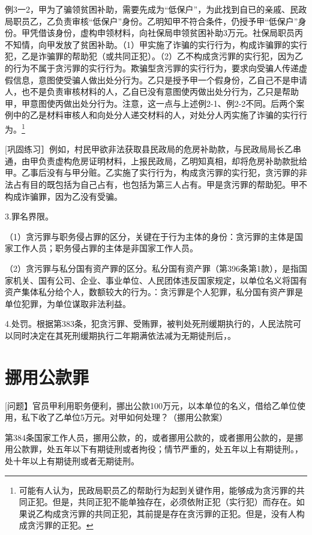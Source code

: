 例3一2，甲为了骗领贫困补助，需要先成为“低保户”，为此找到自已的亲戚、民政局职员乙，乙负责审核“低保户”身份。乙明知甲不符合条件，仍授予甲“低保户”身份。甲凭借该身份，虚构申领材料，向社保局申领贫困补助3万元。社保局职员丙不知情，向甲发放了贫困补助。（1）甲实施了诈骗的实行行为，构成诈骗罪的实行犯，乙是诈骗罪的帮助犯（或共同正犯）。（2）乙不构成贪污罪的实行犯，因为乙的行为不属于贪污罪的实行行为。欺骗型贪污罪的实行行为，要求向受骗人传递虚假信息，意图使受骗人做出处分行为。乙只是授予甲一个假身份，乙自己不是申请人，也不是负责审核材料的人，乙自已没有意图使丙做出处分行为，乙只是帮助甲，甲意图使丙做出处分行为。注意，这一点与上述例2-1、例2-2不同。后两个案例中的乙是材料审核人和向处分人递交材料的人，对处分人丙实施了诈骗的实行行为。\footnote{可能有人认为，民政局职员乙的帮助行为起到关键作用，能够成为贪污罪的共同正犯。但是，共同正犯不能单独存在，必须依附正犯（实行犯）而存在。如果说乙构成贪污罪的共同正犯，其前提是存在贪污罪的正犯。但是，没有人构成贪污罪的正犯。}

[巩固练习］例如，村民甲欲非法获取县民政局的危房补助款，与民政局局长乙串通，由甲负责虚构危房证明材料，上报民政局，乙明知真相，却将危房补助款批给甲。乙事后没有与甲分赃。乙实施了实行行为，构成贪污罪的实行犯，贪污罪的非法占有目的既包括为自己占有，也包括为第三人占有。甲是贪污罪的帮助犯。甲不构成诈骗罪，因为乙没有受骗。

3.罪名界限。

（1）贪污罪与职务侵占罪的区分，关键在于行为主体的身份：贪污罪的主体是国家工作人员；职务侵占罪的主体是非国家工作人员。

（2）贪污罪与私分国有资产罪的区分。私分国有资产罪（第396条第1款），是指国家机关、国有公司、企业、事业单位、人民团体违反国家规定，以单位名义将国有资产集体私分给个人，数额较大的行为。：贪污罪是个人犯罪，私分国有资产罪是单位犯罪，为单位谋取非法利益。

4.处罚。根据第383条，犯贪污罪、受贿罪，被判处死刑缓期执行的，人民法院可以同时决定在其死刑缓期执行二年期满依法减为无期徒刑后，。

\section{挪用公款罪}

[问题】官员甲利用职务便利，挪出公款100万元，以本单位的名义，借给乙单位使用，私下收了乙单位5万元。对甲如何处理？（挪用公款案）

第384条国家工作人员，挪用公款，的，或者挪用公款的，或者挪用公款的，是挪用公款罪，处五年以下有期徒刑或者拘役；情节严重的，处五年以上有期徒刑。，处十年以上有期徒刑或者无期徒刑。

